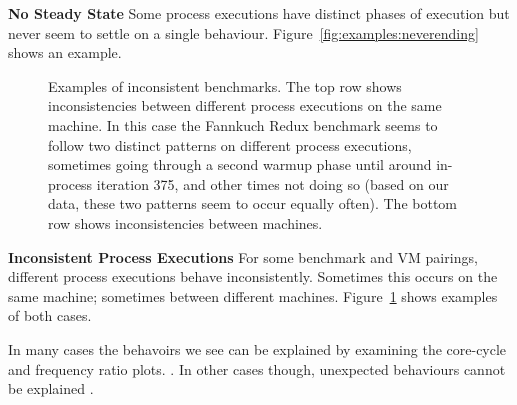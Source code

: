 \documentclass[preprint,numbers,10pt]{sigplanconf}
\begin{document}
\textbf{No Steady State} \label{sub:long}
Some process executions have distinct phases of execution but never seem to
settle on a single behaviour. Figure~\ref{fig:examples:neverending} shows an
example.


\begin{figure}[t!]
\makebox[\textwidth][c]{~}  %
\caption{Examples of inconsistent benchmarks.
The top row shows inconsistencies between different process
executions on the same machine. In this case the Fannkuch Redux benchmark
seems to follow two distinct patterns on different process executions,
sometimes going through a second warmup phase until around in-process iteration 375, and
other times not doing so (based on our data, these two patterns seem to occur
equally often). The bottom row shows inconsistencies between
machines.}
\label{fig:examples:inconsistent}
\end{figure}

\textbf{Inconsistent Process Executions} \label{sub:inconsistent}
For some benchmark and VM pairings, different process executions behave
inconsistently. Sometimes this occurs on the same machine; sometimes between
different machines.
Figure~\ref{fig:examples:inconsistent} shows examples of both cases.

In many cases the behavoirs we see can be explained by examining the core-cycle
and frequency ratio plots. . In other cases though, unexpected
behaviours cannot be explained .
\end{document}
